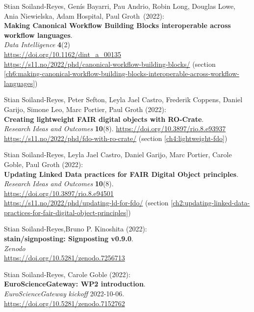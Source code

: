 \begin{thebibliography}{9}
Stian Soiland-Reyes, Genís Bayarri, Pau
Andrio, Robin Long, Douglas Lowe, Ania Niewielska, Adam Hospital, Paul
Groth~(2022):\\
\textbf{Making Canonical Workflow Building Blocks interoperable across workflow languages}.\\
\emph{Data Intelligence} \textbf{4}(2)\\
\url{https://doi.org/10.1162/dint_a_00135}\\
\url{https://s11.no/2022/phd/canonical-workflow-building-blocks/}
(section \vref{ch6:making-canonical-workflow-building-blocks-interoperable-across-workflow-languages})

Stian Soiland-Reyes, Peter Sefton, Leyla Jael Castro, Frederik Coppens,
Daniel Garijo, Simone Leo, Marc Portier, Paul Groth (2022): \\
\textbf{Creating lightweight FAIR digital objects with RO-Crate}.\\
\emph{Research Ideas and Outcomes} \textbf{10}(8).
\url{https://doi.org/10.3897/rio.8.e93937} \\
\url{https://s11.no/2022/phd/fdo-with-ro-crate/}
(section \vref{ch4:lightweight-fdo})

Stian Soiland-Reyes, Leyla Jael Castro, Daniel Garijo, Marc Portier,
Carole Goble, Paul Groth (2022): \\
\textbf{Updating Linked Data practices for FAIR Digital Object principles}. \\
\emph{Research Ideas and Outcomes} \textbf{10}(8).\\
\url{https://doi.org/10.3897/rio.8.e94501}\\
\url{https://s11.no/2022/phd/updating-ld-for-fdo/} (section \vref{ch2:updating-linked-data-practices-for-fair-digital-object-principles})

Stian Soiland-Reyes,Bruno P. Kinoshita (2022):\\
\textbf{stain/signposting: Signposting v0.9.0}.\\
\emph{Zenodo}\\
\url{https://doi.org/10.5281/zenodo.7256713}

Stian Soiland-Reyes, Carole Goble (2022):\\
\textbf{EuroScienceGateway: WP2 introduction}.\\
\emph{EuroScienceGateway kickoff} 2022-10-06.\\
\url{https://doi.org/10.5281/zenodo.7152762}


\end{thebibliography}
